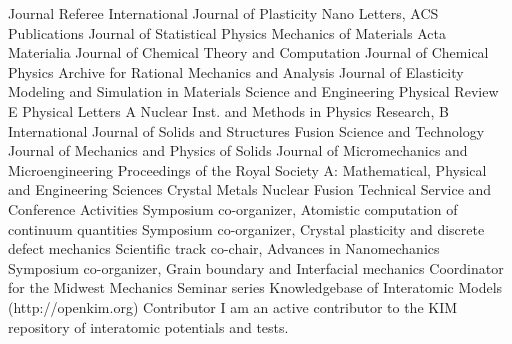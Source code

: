 \documentclass[numbers]{cv}
\begin{document}
\begin{service}
     \serviceitem
        {Journal Referee}
        {
          \eventitem{} {International Journal of Plasticity } {}
          \eventitem{} {Nano Letters, ACS Publications } {}
          \eventitem{} {Journal of Statistical Physics } {}
          \eventitem{} {Mechanics of Materials } {}
          \eventitem{} {Acta Materialia } {}
          \eventitem{} {Journal of Chemical Theory and Computation } {}
          \eventitem{} {Journal of Chemical Physics } {}
          \eventitem{} {Archive for Rational Mechanics and Analysis } {}
          \eventitem{} {Journal of Elasticity } {}
          \eventitem{} {Modeling and Simulation in Materials Science and Engineering }{}
          \eventitem{} {Physical Review E }{}
          \eventitem{} {Physical Letters A }{}
          \eventitem{} {Nuclear Inst. and Methods in Physics Research, B }{}
          \eventitem{} {International Journal of Solids and Structures } {}
          \eventitem{} {Fusion Science and Technology } {}
          \eventitem{} {Journal of Mechanics and Physics of Solids } {}
          \eventitem{} {Journal of Micromechanics and Microengineering} {}
          \eventitem{} {Proceedings of the Royal Society A: Mathematical, Physical and Engineering Sciences }{}
          \eventitem{} {Crystal } {}
          \eventitem{} {Metals } {}
          \eventitem{} {Nuclear Fusion } {}
       }
    \serviceitem
        {Technical Service and Conference Activities}
        {
             {\hspace{-0.6cm}Symposium co-organizer, Atomistic computation of continuum quantities} {}
             {\hspace{-0.6cm}Symposium co-organizer, Crystal plasticity and discrete defect mechanics} {}
             {\hspace{-0.6cm}Scientific track co-chair, Advances in Nanomechanics}{}
             {\hspace{-0.6cm}Symposium co-organizer, Grain boundary and Interfacial mechanics}{}
             {\hspace{-0.6cm}Coordinator for the Midwest Mechanics Seminar series} {}
        }
    \serviceitem
        {Knowledgebase of Interatomic Models (http://openkim.org)}
        {
        {Contributor}
        {I am an active contributor to the KIM repository of
         interatomic potentials and tests.}}
\end{service}
\end{document}
